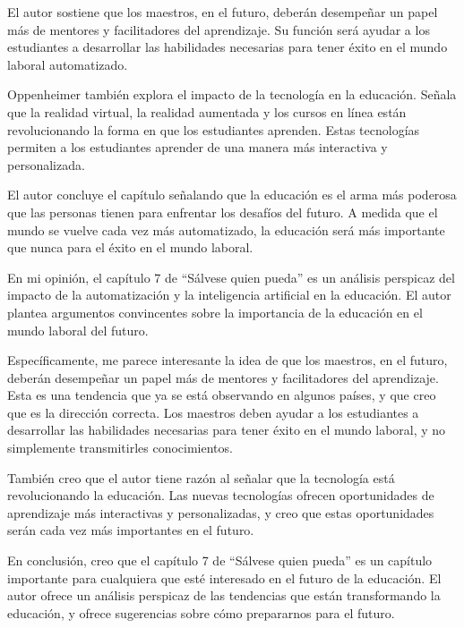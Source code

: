 \documentclass[letterpaper, 12pt]{article}
\begin{document}
\begin{itemize}[label=$\triangleright$]
            El autor sostiene que los maestros, en el futuro, deberán
            desempeñar un papel más de mentores y facilitadores del
            aprendizaje. Su función será ayudar a los estudiantes a
            desarrollar las habilidades necesarias para tener éxito en
            el mundo laboral automatizado.

            Oppenheimer también explora el impacto de la tecnología en
            la educación. Señala que la realidad virtual, la realidad
            aumentada y los cursos en línea están revolucionando la
            forma en que los estudiantes aprenden. Estas tecnologías
            permiten a los estudiantes aprender de una manera más
            interactiva y personalizada.

            El autor concluye el capítulo señalando que la educación es
            el arma más poderosa que las personas tienen para enfrentar
            los desafíos del futuro. A medida que el mundo se vuelve
            cada vez más automatizado, la educación será más importante
            que nunca para el éxito en el mundo laboral.

            En mi opinión, el capítulo 7 de ``Sálvese quien pueda'' es
            un análisis perspicaz del impacto de la automatización y la
            inteligencia artificial en la educación. El autor plantea
            argumentos convincentes sobre la importancia de la
            educación en el mundo laboral del futuro.

            Específicamente, me parece interesante la idea de que los
            maestros, en el futuro, deberán desempeñar un papel más de
            mentores y facilitadores del aprendizaje. Esta es una
            tendencia que ya se está observando en algunos países, y
            que creo que es la dirección correcta. Los maestros deben
            ayudar a los estudiantes a desarrollar las habilidades
            necesarias para tener éxito en el mundo laboral, y no
            simplemente transmitirles conocimientos.

            También creo que el autor tiene razón al señalar que la
            tecnología está revolucionando la educación. Las nuevas
            tecnologías ofrecen oportunidades de aprendizaje más
            interactivas y personalizadas, y creo que estas
            oportunidades serán cada vez más importantes en el futuro.

            En conclusión, creo que el capítulo 7 de ``Sálvese quien
            pueda'' es un capítulo importante para cualquiera que esté
            interesado en el futuro de la educación. El autor ofrece un
            análisis perspicaz de las tendencias que están
            transformando la educación, y ofrece sugerencias sobre cómo
            prepararnos para el futuro.
\end{itemize}
\end{document}
